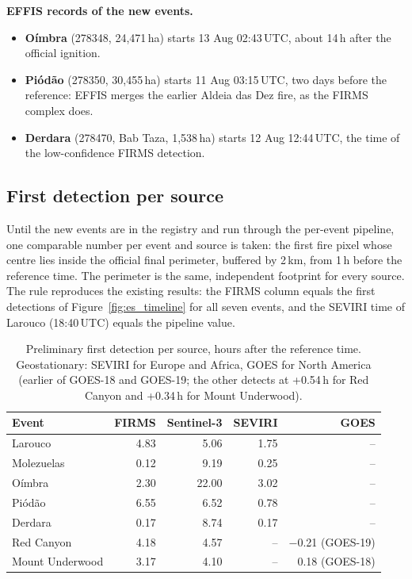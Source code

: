\documentclass[11pt]{article}
\begin{document}
\textbf{EFFIS records of the new events.}
\begin{itemize}[leftmargin=1.2cm]
    \item \textbf{O\'imbra} (278348, 24{,}471\,ha) starts 13 Aug 02:43\,UTC, about 14\,h after the official ignition.
    \item \textbf{Pi\'od\~ao} (278350, 30{,}455\,ha) starts 11 Aug 03:15\,UTC, two days before the reference: EFFIS merges the earlier Aldeia das Dez fire, as the FIRMS complex does.
    \item \textbf{Derdara} (278470, Bab Taza, 1{,}538\,ha) starts 12 Aug 12:44\,UTC, the time of the low-confidence FIRMS detection.
\end{itemize}

\subsection{First detection per source}

Until the new events are in the registry and run through the per-event pipeline, one comparable number per event and source is taken: the first fire pixel whose centre lies inside the official final perimeter, buffered by 2\,km, from 1\,h before the reference time. The perimeter is the same, independent footprint for every source. The rule reproduces the existing results: the FIRMS column equals the first detections of Figure~\ref{fig:es_timeline} for all seven events, and the SEVIRI time of Larouco (18:40\,UTC) equals the pipeline value.

\begin{longtable}{|l|r|r|r|r|}
\caption{Preliminary first detection per source, hours after the reference time. Geostationary: SEVIRI for Europe and Africa, GOES for North America (earlier of GOES-18 and GOES-19; the other detects at +0.54\,h for Red Canyon and +0.34\,h for Mount Underwood).}\label{tab:s0first}\\
\hline
\rowcolor{tablehead}
\textbf{Event} & \textbf{FIRMS} & \textbf{Sentinel-3} & \textbf{SEVIRI} & \textbf{GOES} \\
\hline
\endhead
Larouco & 4.83 & 5.06 & 1.75 & -- \\
\hline
Molezuelas & 0.12 & 9.19 & 0.25 & -- \\
\hline
O\'imbra & 2.30 & 22.00 & 3.02 & -- \\
\hline
Pi\'od\~ao & 6.55 & 6.52 & 0.78 & -- \\
\hline
Derdara & 0.17 & 8.74 & 0.17 & -- \\
\hline
Red Canyon & 4.18 & 4.57 & -- & $-$0.21 (GOES-19) \\
\hline
Mount Underwood & 3.17 & 4.10 & -- & 0.18 (GOES-18) \\
\hline
\end{longtable}
\end{document}
